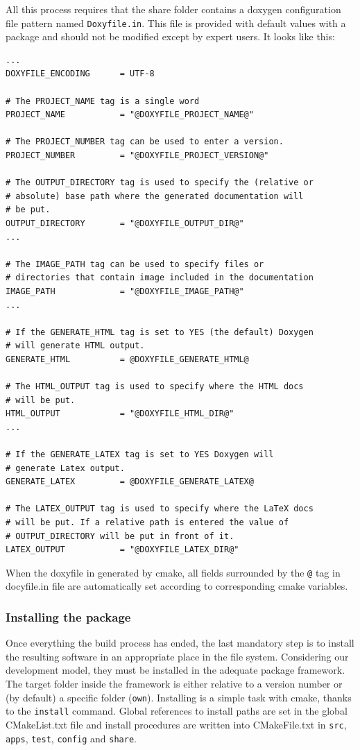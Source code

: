 \documentclass[12pt,a4paper]{article}
\begin{document}
All this process requires that the share folder contains a doxygen configuration file pattern named \texttt{Doxyfile.in}. This file is provided with default values with a package and should not be modified except by expert users. It looks like this:
\begin{verbatim}
...
DOXYFILE_ENCODING      = UTF-8

# The PROJECT_NAME tag is a single word 
PROJECT_NAME           = "@DOXYFILE_PROJECT_NAME@"

# The PROJECT_NUMBER tag can be used to enter a version. 
PROJECT_NUMBER         = "@DOXYFILE_PROJECT_VERSION@"

# The OUTPUT_DIRECTORY tag is used to specify the (relative or 
# absolute) base path where the generated documentation will 
# be put. 
OUTPUT_DIRECTORY       = "@DOXYFILE_OUTPUT_DIR@"
...

# The IMAGE_PATH tag can be used to specify files or 
# directories that contain image included in the documentation
IMAGE_PATH             = "@DOXYFILE_IMAGE_PATH@"
...

# If the GENERATE_HTML tag is set to YES (the default) Doxygen 
# will generate HTML output.
GENERATE_HTML          = @DOXYFILE_GENERATE_HTML@

# The HTML_OUTPUT tag is used to specify where the HTML docs 
# will be put. 
HTML_OUTPUT            = "@DOXYFILE_HTML_DIR@"
...

# If the GENERATE_LATEX tag is set to YES Doxygen will 
# generate Latex output.
GENERATE_LATEX         = @DOXYFILE_GENERATE_LATEX@

# The LATEX_OUTPUT tag is used to specify where the LaTeX docs 
# will be put. If a relative path is entered the value of 
# OUTPUT_DIRECTORY will be put in front of it. 
LATEX_OUTPUT           = "@DOXYFILE_LATEX_DIR@"

\end{verbatim}

When the doxyfile in generated by cmake, all fields surrounded by the \verb|@| tag in docyfile.in file are automatically set according to corresponding cmake variables.

\subsubsection{Installing the package}

Once everything the build process has ended, the last mandatory step is to install the resulting software in an appropriate place in the file system. Considering our development model, they must be installed in the adequate package framework. The target folder inside the framework is either relative to a version number or (by default) a specific folder (\verb|own|). Installing is a simple task with cmake, thanks to the \verb|install| command. Global references to install paths are set in the global CMakeList.txt file and install procedures are written into CMakeFile.txt in \texttt{src}, \texttt{apps}, \texttt{test}, \texttt{config} and \texttt{share}.
\end{document}
